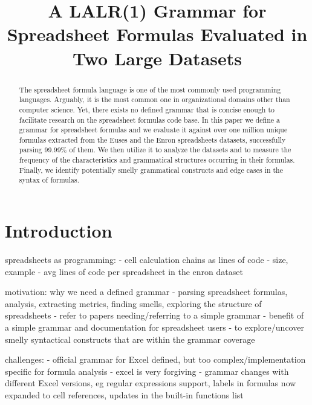 \documentclass[conference]{IEEEtran}
\begin{document}
\title{A LALR(1) Grammar for Spreadsheet Formulas Evaluated in Two Large Datasets}

\author{
}
\maketitle

\begin{abstract}
The spreadsheet formula language is one of the most commonly used programming languages. Arguably, it is the most common one in organizational domains other than computer science. Yet, there exists no defined grammar that is concise enough to facilitate research on the spreadsheet formulas code base. In this paper we define a grammar for spreadsheet formulas and we evaluate it against over one million unique formulas extracted from the Euses and the Enron spreadsheets datasets, successfully parsing 99.99\% of them. We then utilize it to analyze the datasets and to measure the frequency of the characteristics and grammatical structures occurring in their formulas. Finally, we identify potentially smelly grammatical constructs and edge cases in the syntax of formulas.
\end{abstract}

\IEEEpeerreviewmaketitle


\section{Introduction}

spreadsheets as programming:
- cell calculation chains as lines of code - size, example
- avg lines of code per spreadsheet in the enron dataset

motivation: why we need a defined grammar
- parsing spreadsheet formulas, analysis, extracting metrics, finding smells, exploring the structure of spreadsheets
- refer to papers needing/referring to a simple grammar
- benefit of a simple grammar and documentation for spreadsheet users
- to explore/uncover smelly syntactical constructs that are within the grammar coverage

challenges:
- official grammar for Excel defined, but too complex/implementation specific for formula analysis
- excel is very forgiving
- grammar changes with different Excel versions, eg regular expressions support, labels in formulas now expanded to cell
references, updates in the built-in functions list
\end{document}
